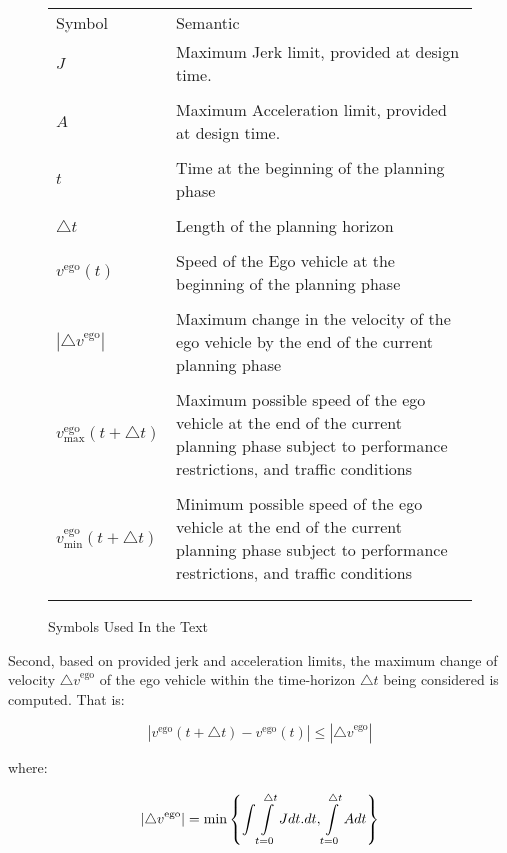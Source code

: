 \documentclass{article}
\providecommand{\tabularnewline}{\\}
\begin{document}
\begin{figure*}[!h]
    \begin{tabular*}{1\textwidth}{@{\extracolsep{\fill}}>{\raggedleft}p{}>{\raggedright}p{}}
        Symbol & Semantic\tabularnewline
        $J$ & Maximum Jerk limit, provided at design time. \\[1em]\tabularnewline
        $A$ & Maximum Acceleration limit, provided at design time. \\[1em]\tabularnewline
        $t$ & Time at the beginning of the planning phase\\[1em]\tabularnewline
        $\triangle t$ & Length of the planning horizon\\[1em]\tabularnewline
        $v^{\text{ego}}(t)$ & Speed of the Ego vehicle at the beginning of the planning phase\\[1em]\tabularnewline
        $\left|{\triangle v}^{\text{ego}}\right|$ & Maximum change in the velocity of the ego vehicle by the end of the current planning phase \\[1em]\tabularnewline
        $v^{\text{ego}}_{\text{max}}( t+\triangle t )$ & Maximum possible speed of the ego vehicle at the end of the current planning phase subject to performance restrictions, and traffic conditions \\[1em]\tabularnewline
        $v^{\text{ego}}_{\text{min}}( t+\triangle t )$ & Minimum possible speed of the ego vehicle at the end of the current planning phase subject to performance restrictions, and traffic conditions \\[1em]\tabularnewline
        & \tabularnewline
    \end{tabular*}
    
    \caption{Symbols Used In the Text}
    
    
\end{figure*}

Second, based on provided jerk and acceleration limits, the maximum change of velocity $ {\triangle v}^{\text{ego}} $ of the ego vehicle within the time-horizon  $ \triangle t $ being considered is computed. That is:


\begin{equation}
\left| v^{\text{ego}} ( t+\triangle t ) - v^{\text{ego}}(t) \right|   \leq \left| {\triangle v}^{\text{ego}} \right|
\end{equation}

where:

\begin{equation}
\left| {\triangle v}^{\text{ego}} \right| = \text{min}\left\{ \intop\intop_{t=0}^{\triangle t}Jdt.dt,\intop_{t=0}^{\triangle t}Adt\right\}
\end{equation}
\end{document}
